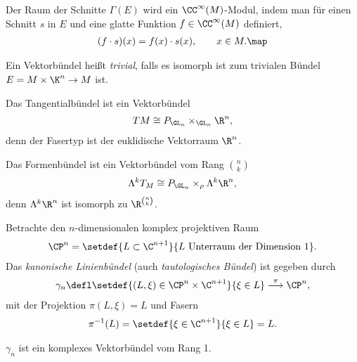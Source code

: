\documentclass[%
	paper=a5,%
	fleqn,%
	DIV=18,%
	BCOR=0mm,
	fontsize=11pt,
	titlepage=false,%
	bibliography=totoc,
	DIV=18,%
	twoside=true,
	pdftitle=Riemannsche Geometrie,
	pdfauthor=Uwe Semmelmann,
	numbers=noendperiod]%
	{scrbook}
\begin{document}
\begin{rem}
Der Raum der Schnitte 
$\Gamma(E)$ wird ein $\CC^\infty(M)$-Modul, indem man für einen Schnitt $s$ in
$E$ und eine glatte Funktion $f\in\CC^\infty(M)$ definiert,
\begin{align*}
(f\cdot s)(x) = f(x)\cdot s(x),\qquad x\in M.\map
\end{align*}
\end{rem}

\begin{defn}
Ein Vektorbündel heißt \emph{trivial}, falls es isomorph ist zum trivialen
Bündel $E=M\times \K^n\to M$ ist.\fish
\end{defn}

\begin{ex}
\begin{exenum}
\item
Das Tangentialbündel ist ein Vektorbündel
\begin{align*}
TM \cong P_{\GL_n}\times_{\GL_n}\R^n, 
\end{align*}
denn der Fasertyp ist der euklidische Vektorraum $\R^n$.
\item Das Formenbündel ist ein Vektorbündel vom Rang $\binom{n}{k}$
\begin{align*}
\Lambda^k T_M \cong P_{\GL_n}\times_{\rho}\Lambda^k\R^n,
\end{align*}
denn $\Lambda^k\R^n$ ist isomorph zu $\R^{\binom{n}{k}}$.
\item Betrachte den $n$-dimensionalen komplex projektiven Raum 
\begin{align*} 
\CP^n = \setdef{L\subset \C^{n+1}}{L\text{ Unterraum der Dimension
}1}.
\end{align*}
Das \emph{kanonische Linienbündel} (auch \emph{tautologisches Bündel}) ist
gegeben durch
\begin{align*}
\gamma_n \defl \setdef{(L,\xi)\in \CP^n\times\C^{n+1}}{\xi\in L}
\overset{\pi}{\longrightarrow} \CP^n,
\end{align*}
mit der Projektion $\pi(L,\xi) = L$ und Fasern
\begin{align*}
\pi^{-1}(L) = \setdef{\xi\in\C^{n+1}}{\xi\in L} = L.
\end{align*}
\begin{lem*}
$\gamma_n$ ist ein komplexes Vektorbündel vom Rang 1.\fish
\end{lem*}


\end{exenum}
\end{ex}
\end{document}
